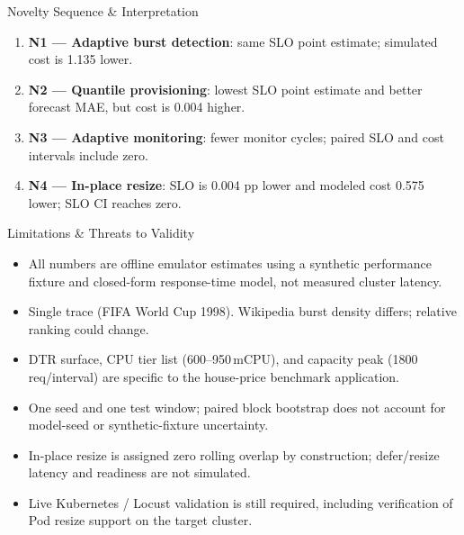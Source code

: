 \documentclass[aspectratio=169,10pt]{beamer}
\begin{document}
\begin{frame}{Novelty Sequence \& Interpretation}
\begin{enumerate}
  \item \textbf{N1 --- Adaptive burst detection}: same SLO point estimate; simulated cost is 1.135 lower.
  \item \textbf{N2 --- Quantile provisioning}: lowest SLO point estimate and better forecast MAE, but cost is 0.004 higher.
  \item \textbf{N3 --- Adaptive monitoring}: fewer monitor cycles; paired SLO and cost intervals include zero.
  \item \textbf{N4 --- In-place resize}: SLO is 0.004 pp lower and modeled cost 0.575 lower; SLO CI reaches zero.
\end{enumerate}
\end{frame}

\begin{frame}{Limitations \& Threats to Validity}
\begin{itemize}
  \item All numbers are offline emulator estimates using a synthetic performance fixture and closed-form response-time model, not measured cluster latency.
  \item Single trace (FIFA World Cup 1998). Wikipedia burst density differs; relative ranking could change.
  \item DTR surface, CPU tier list (600--950\,mCPU), and capacity peak (1800 req/interval) are specific to the house-price benchmark application.
  \item One seed and one test window; paired block bootstrap does not account for model-seed or synthetic-fixture uncertainty.
  \item In-place resize is assigned zero rolling overlap by construction; defer/resize latency and readiness are not simulated.
  \item Live Kubernetes / Locust validation is still required, including verification of Pod resize support on the target cluster.
\end{itemize}
\end{frame}
\end{document}
